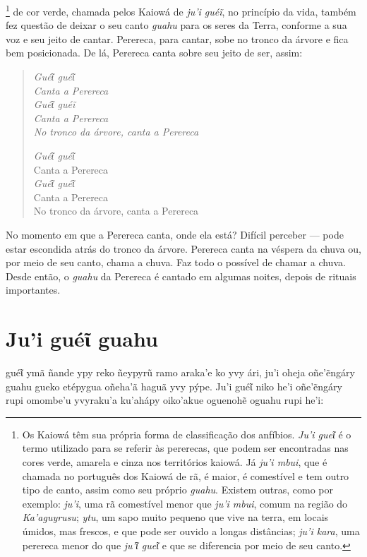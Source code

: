 \footnote{Os Kaiowá têm sua própria forma de classificação dos
  anfíbios. \emph{Ju'i gueῖ} é o termo utilizado para se referir às
  pererecas, que podem ser encontradas nas cores verde, amarela e cinza
  nos territórios kaiowá. Já \emph{ju'i mbui}, que é chamada no
  português dos Kaiowá de rã, é maior, é comestível e tem outro tipo de
  canto, assim como seu próprio \emph{guahu}. Existem outras, como por
  exemplo: \emph{ju'i}, uma rã comestível menor que \emph{ju'i mbui},
  comum na região do \emph{Ka'aguyrusu}; \emph{ytu}, um sapo muito pequeno que
  vive na terra, em locais úmidos, mas frescos, e que pode ser ouvido a
  longas distâncias; \emph{ju'i kara}, uma perereca menor do que
  \emph{ju'ῖ gueῖ} e que se diferencia por meio de seu canto.} de cor
  verde, chamada pelos Kaiowá de \emph{ju'i guéĩ}, no princípio da vida,
  também fez questão de deixar o seu canto \emph{guahu} para os seres da
  Terra, conforme a sua voz e seu jeito de cantar. Perereca, para cantar,
  sobe no tronco da árvore e fica bem posicionada. De lá, Perereca canta
  sobre seu jeito de ser, assim:

\begin{verse}
\itshape
\emph{Guéῖ guéῖ}\\
Canta a Perereca\\
\emph{Guéῖ guéĩ}\\
Canta a Perereca\\
No tronco da árvore, canta a Perereca

\emph{Guéῖ guéῖ}\\
Canta a Perereca\\
\emph{Guéῖ guéῖ}\\
Canta a Perereca\\
No tronco da árvore, canta a Perereca
\end{verse}

No momento em que a Perereca canta, onde ela está? Difícil perceber ---
pode estar escondida atrás do tronco da árvore. Perereca canta na
véspera da chuva ou, por meio de seu canto, chama a chuva. Faz todo o
possível de chamar a chuva. Desde então, o \emph{guahu} da Perereca é
cantado em algumas noites, depois de rituais importantes.

\chapter{Ju’i guéῖ guahu}

 guéῖ ymã ñande ypy reko ñeypyrũ ramo araka'e ko yvy ári, ju'i oheja
oñe'ẽngáry guahu gueko etépygua oñeha'ã haguã yvy pýpe. Ju'i guéῖ niko
he'i oñe'ẽngáry rupi omombe'u yvyraku'a ku'ahápy oiko'akue oguenohẽ
oguahu rupi he'i:


